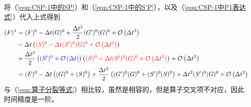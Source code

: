 \documentclass{ctexart}
\begin{document}
将（\ref{eqn:CSP-1中的SP}）和（\ref{eqn:CSP-1中的S'P}），以及（\ref{eqn:CSP-1中P1表达式}）代入上式得到
\begin{align}
  (F)^1 & = (F)^0 - \Delta{t} (G)^0 + \frac{\Delta{t}^2}{2} (G^\prime)^0 (G)^0 + \mathcal{O} \left( \Delta{t}^3 \right) \nonumber \\
  & - \Delta{t} \left( {\color{red}(S)^0 - \Delta{t} (S^\prime)^0 (G)^0 + \mathcal{O} \left( \Delta{t}^2 \right)} \right) \nonumber \\
  & + \frac{\Delta{t}^2}{2} \left( {\color{blue}(S^\prime)^0 + \mathcal{O} \left( \Delta{t} \right)} \right) \left( {\color{red}(S)^0 - \Delta{t} (S^\prime)^0 (G)^0 + \mathcal{O} \left( \Delta{t}^2 \right)} \right) + \mathcal{O} \left( \Delta{t}^3 \right) \nonumber \\
  & = (F)^0 - \Delta{t} \left( (G)^0 + (S)^0 \right) + \frac{\Delta{t}^2}{2} \left( (G^\prime)^0 (G)^0 + (S^\prime)^0 (S)^0 \right) + \Delta{t}^2 (S^\prime)^0 (G)^0 + \mathcal{O} \left( \Delta{t}^3 \right)
\end{align}
与（\ref{eqn:算子分裂等式}）相比较，虽然是相容的，但是算子交叉项不对应，因此时间精度是一阶。
\end{document}
